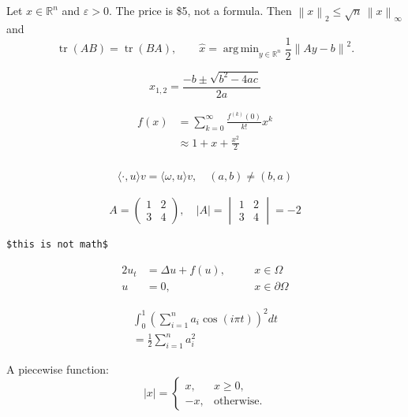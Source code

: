 \documentclass{article}
\newcommand{\R}{\mathbb{R}}
\newcommand{\norm}[1]{\left\| #1 \right\|}
\newcommand{\ip}[2][\cdot]{\langle #1, #2 \rangle}
\renewcommand{\epsilon}{\varepsilon}
\DeclareMathOperator{\tr}{tr}
\DeclareMathOperator*{\argmin}{arg\,min}
\def\half{\frac{1}{2}}
\def\pair(#1,#2){\left(#1, #2\right)}
\let\oldsqrt\sqrt
\begin{document}
Let $x \in \R^n$ and $\epsilon > 0$. The price is \$5, not a formula. %
Then \(\norm{x}_2 \le \sqrt{n}\,\norm{x}_\infty\) and
\[ \tr(AB) = \tr(BA), \qquad \hat{x} = \argmin_{y \in \R^n} \half \norm{Ay - b}^2 . \]

\begin{equation}\label{eq:quad}
  x_{1,2} = \frac{-b \pm \oldsqrt{b^2 - 4ac}}{2a}
\end{equation}

\begin{align*}
  f(x) &= \sum_{k=0}^{\infty} \frac{f^{(k)}(0)}{k!} x^k \\
       &\approx 1 + x + \frac{x^2}{2} \nonumber \\
\end{align*}

\begin{gather}
  \ip{u}{v} = \ip[\omega]{u}{v}, \quad \pair(a,b) \ne \pair(b,a)
\end{gather}

$$ A = \begin{pmatrix} 1 & 2 \\ 3 & 4 \end{pmatrix}, \quad
   |A| = \begin{vmatrix} 1 & 2 \\ 3 & 4 \end{vmatrix} = -2 $$

\begin{verbatim}
$this is not math$
\end{verbatim}

\begin{alignat}{2}
  u_t &= \Delta u + f(u), &\quad& x \in \Omega \\
  u   &= 0,               &    & x \in \partial\Omega
\end{alignat}

\begin{multline}
  \int_0^1 \!\! \left( \sum_{i=1}^{n} a_i \cos(i \pi t) \right)^2 dt \\
  = \frac{1}{2} \sum_{i=1}^{n} a_i^2
\end{multline}

A piecewise function:
\[ |x| = \begin{cases} x, & x \ge 0, \\ -x, & \text{otherwise.} \end{cases} \]
\end{document}
